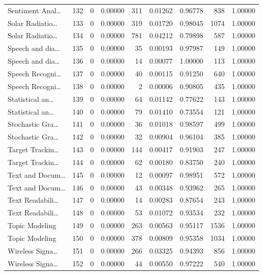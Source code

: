\begin{table}
\begin{tabular}{lrrrrrrrr}
Sentiment Anal… & 132 & 0 & 0.00000 & 311 & 0.01262 & 0.96778 & 838 & 1.00000 \\
Solar Radiatio… & 133 & 0 & 0.00000 & 319 & 0.01720 & 0.98045 & 1074 & 1.00000 \\
Solar Radiatio… & 134 & 0 & 0.00000 & 781 & 0.04212 & 0.79898 & 587 & 1.00000 \\
Speech and dia… & 135 & 0 & 0.00000 & 35 & 0.00193 & 0.97987 & 149 & 1.00000 \\
Speech and dia… & 136 & 0 & 0.00000 & 14 & 0.00077 & 1.00000 & 113 & 1.00000 \\
Speech Recogni… & 137 & 0 & 0.00000 & 40 & 0.00115 & 0.91250 & 640 & 1.00000 \\
Speech Recogni… & 138 & 0 & 0.00000 & 2 & 0.00006 & 0.90805 & 435 & 1.00000 \\
Statistical an… & 139 & 0 & 0.00000 & 64 & 0.01142 & 0.77622 & 143 & 1.00000 \\
Statistical an… & 140 & 0 & 0.00000 & 79 & 0.01410 & 0.73554 & 121 & 1.00000 \\
Stochastic Gra… & 141 & 0 & 0.00000 & 36 & 0.01018 & 0.98597 & 499 & 1.00000 \\
Stochastic Gra… & 142 & 0 & 0.00000 & 32 & 0.00904 & 0.96104 & 385 & 1.00000 \\
Target Trackin… & 143 & 0 & 0.00000 & 144 & 0.00417 & 0.91903 & 247 & 1.00000 \\
Target Trackin… & 144 & 0 & 0.00000 & 62 & 0.00180 & 0.83750 & 240 & 1.00000 \\
Text and Docum… & 145 & 0 & 0.00000 & 12 & 0.00097 & 0.98951 & 572 & 1.00000 \\
Text and Docum… & 146 & 0 & 0.00000 & 43 & 0.00348 & 0.93962 & 265 & 1.00000 \\
Text Readabili… & 147 & 0 & 0.00000 & 14 & 0.00283 & 0.87654 & 243 & 1.00000 \\
Text Readabili… & 148 & 0 & 0.00000 & 53 & 0.01072 & 0.93534 & 232 & 1.00000 \\
Topic Modeling & 149 & 0 & 0.00000 & 263 & 0.00563 & 0.95117 & 1536 & 1.00000 \\
Topic Modeling & 150 & 0 & 0.00000 & 378 & 0.00809 & 0.95358 & 1034 & 1.00000 \\
Wireless Signa… & 151 & 0 & 0.00000 & 266 & 0.03325 & 0.94393 & 856 & 1.00000 \\
Wireless Signa… & 152 & 0 & 0.00000 & 44 & 0.00550 & 0.97222 & 540 & 1.00000 \\
\bottomrule
\end{tabular}
\end{table}
